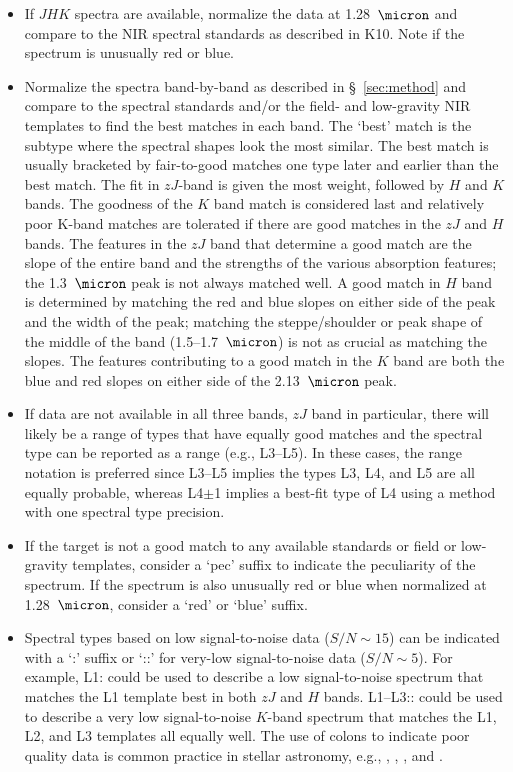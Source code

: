 \documentclass[12pt]{aastex6}
\begin{document}
\begin{itemize}
	\item If $JHK$ spectra are available, normalize the data at 1.28~$\micron$ and compare to the NIR spectral standards as described in K10. Note if the spectrum is unusually red or blue.

	\item Normalize the spectra band-by-band as described in \S~\ref{sec:method} and compare to the spectral standards and/or the field- and low-gravity NIR templates to find the best matches in each band.
	The `best' match is the subtype where the spectral shapes look the most similar. The best match is usually bracketed by fair-to-good matches one type later and earlier than the best match.
	The fit in $zJ$-band is given the most weight, followed by $H$ and $K$ bands. The goodness of the $K$ band match is considered last and relatively poor K-band matches are tolerated if there are good matches in the $zJ$ and $H$ bands.
	The features in the $zJ$ band that determine a good match are the slope of the entire band and the strengths of the various absorption features; the 1.3~$\micron$ peak is not always matched well.
	A good match in $H$ band is determined by matching the red and blue slopes on either side of the peak and the width of the peak; matching the steppe/shoulder or peak shape of the middle of the band (1.5--1.7~$\micron$) is not as crucial as matching the slopes.
The features contributing to a good match in the $K$ band are both the blue and red slopes on either side of the 2.13~$\micron$ peak.
	\item If data are not available in all three bands, $zJ$ band in particular, there will likely be a range of types that have equally good matches and the spectral type can be reported as a range (e.g., L3--L5). In these cases, the range notation is preferred since L3--L5 implies the types L3, L4, and L5 are all equally probable, whereas L4$\pm$1 implies a best-fit type of L4 using a method with one spectral type precision.
	\item If the target is not a good match to any available standards or field or low-gravity templates, consider a `pec' suffix to indicate the peculiarity of the spectrum. If the spectrum is also unusually red or blue when normalized at 1.28~$\micron$, consider a `red' or `blue' suffix.
	\item Spectral types based on low signal-to-noise data ($S/N\sim15$) can be indicated with a `:' suffix or `::' for very-low signal-to-noise data ($S/N\sim5$).
    For example, L1: could be used to describe a low signal-to-noise spectrum that matches the L1 template best in both $zJ$ and $H$ bands. L1--L3:: could be used to describe a very low signal-to-noise $K$-band spectrum that matches the L1, L2, and L3 templates all equally well.
	The use of colons to indicate poor quality data is common practice in stellar astronomy, e.g., \citet{Sanduleak:1988fn}, \cite{Silvestri:2006el}, \citet[Table 12.1]{Gray:2009wd}, and \cite{Covey:2010de}.

\end{itemize}
\end{document}
